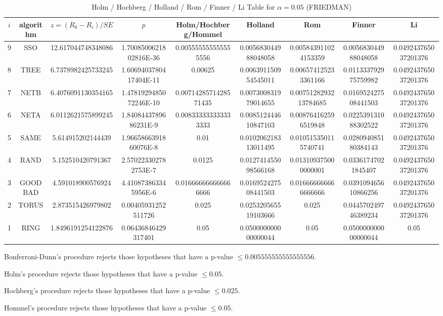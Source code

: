 \documentclass[a4paper,10pt]{article}
\begin{document}
\begin{landscape}
\begin{table}[!htp]
\centering\scriptsize
\caption{Holm / Hochberg / Holland / Rom / Finner / Li Table for $\alpha=0.05$ (FRIEDMAN)}
\begin{tabular}{ccccccccc}
$i$&algorithm&$z=(R_0 - R_i)/SE$&$p$&Holm/Hochberg/Hommel&Holland&Rom&Finner&Li\\
\hline
9& SSO&12.617044748348086&1.7008500621802816E-36&0.005555555555555556&0.005683044988048058&0.005843911024153359&0.005683044988048058&0.049243765037201376\\
8& TREE&6.7378982425733245&1.6069403780417404E-11&0.00625&0.006391150954545011&0.006574125233361166&0.011333792975759982&0.049243765037201376\\
7& NETB&6.4076091130354165&1.4781929485072246E-10&0.0071428571428571435&0.007300831979014655&0.0075128293213784685&0.016952427508441503&0.049243765037201376\\
6& NETA&6.0112621575899245&1.8408443789686231E-9&0.008333333333333333&0.008512444610847103&0.008764162596519848&0.022539131088302522&0.049243765037201376\\
5& SAME&5.614915202144439&1.9665866391860076E-8&0.01&0.010206218313011495&0.010515350115740741&0.028094085180384143&0.049243765037201376\\
4& RAND&5.152510420791367&2.570223302782753E-7&0.0125&0.012741455098566168&0.013109375000000001&0.03361747021845407&0.049243765037201376\\
3& GOODBAD&4.591018900576924&4.410873863345956E-6&0.016666666666666666&0.016952427508441503&0.016666666666666666&0.039109465610866256&0.049243765037201376\\
2& TORUS&2.873515426979802&0.00405931252511726&0.025&0.025320565519103666&0.025&0.044570249746389234&0.049243765037201376\\
1& RING&1.8496191254122876&0.06436846429317401&0.05&0.050000000000000044&0.05&0.050000000000000044&0.05\\
\hline
\end{tabular}
\end{table}
Bonferroni-Dunn's procedure rejects those hypotheses that have a p-value $\le0.005555555555555556$.


Holm's procedure rejects those hypotheses that have a p-value $\le0.05$.


Hochberg's procedure rejects those hypotheses that have a p-value $\le0.025$.


Hommel's procedure rejects those hypotheses that have a p-value $\le0.05$.



\end{landscape}
\end{document}
